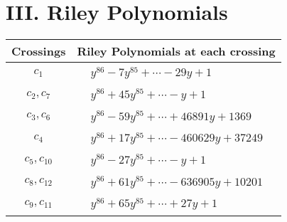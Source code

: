 \documentclass[1p]{elsarticle_modified}
\theoremstyle{definition}
\begin{document}
\centering \section*{ III. Riley Polynomials}
\begin{tabular}{m{50pt}|m{274pt}}
Crossings & \hspace{64pt}Riley Polynomials at each crossing \\
\hline $$\begin{aligned}c_{1}\end{aligned}$$&$\begin{aligned}
&y^{86}-7 y^{85}+\cdots-29 y+1
\end{aligned}$\\
\hline $$\begin{aligned}c_{2},c_{7}\end{aligned}$$&$\begin{aligned}
&y^{86}+45 y^{85}+\cdots- y+1
\end{aligned}$\\
\hline $$\begin{aligned}c_{3},c_{6}\end{aligned}$$&$\begin{aligned}
&y^{86}-59 y^{85}+\cdots+46891 y+1369
\end{aligned}$\\
\hline $$\begin{aligned}c_{4}\end{aligned}$$&$\begin{aligned}
&y^{86}+17 y^{85}+\cdots-460629 y+37249
\end{aligned}$\\
\hline $$\begin{aligned}c_{5},c_{10}\end{aligned}$$&$\begin{aligned}
&y^{86}-27 y^{85}+\cdots- y+1
\end{aligned}$\\
\hline $$\begin{aligned}c_{8},c_{12}\end{aligned}$$&$\begin{aligned}
&y^{86}+61 y^{85}+\cdots-636905 y+10201
\end{aligned}$\\
\hline $$\begin{aligned}c_{9},c_{11}\end{aligned}$$&$\begin{aligned}
&y^{86}+65 y^{85}+\cdots+27 y+1
\end{aligned}$\\
\hline
\end{tabular}
\vskip 2pc
\end{document}

